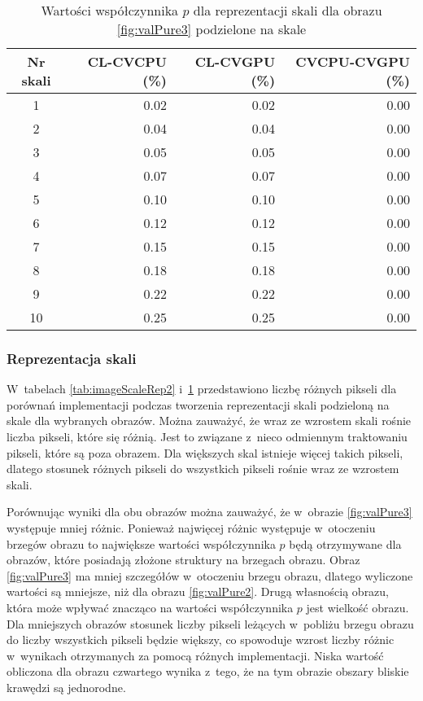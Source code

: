 \begin{center}
\begin{table}
\centering
\caption{Wartości współczynnika $ p $ dla reprezentacji skali dla obrazu \ref{fig:valPure3} podzielone na skale}
\label{tab:imageScaleRep3}
\begin{tabular}{|c|r|r|r|}
 \hline
Nr skali & CL-CVCPU (\%) & CL-CVGPU (\%) & CVCPU-CVGPU (\%) \\ \hline
1        & 0.02     & 0.02     & 0.00        \\ \hline
2        & 0.04     & 0.04     & 0.00        \\ \hline
3        & 0.05     & 0.05     & 0.00        \\ \hline
4        & 0.07     & 0.07     & 0.00        \\ \hline
5        & 0.10     & 0.10     & 0.00        \\ \hline
6        & 0.12     & 0.12     & 0.00        \\ \hline
7        & 0.15     & 0.15     & 0.00        \\ \hline
8        & 0.18     & 0.18     & 0.00        \\ \hline
9        & 0.22     & 0.22     & 0.00        \\ \hline
10       & 0.25     & 0.25     & 0.00        \\ \hline
\end{tabular}
\end{table}
\end{center}

\subsubsection{Reprezentacja skali}
\label{subsubsec:reprezentacjaSakliTabele}

W~tabelach \ref{tab:imageScaleRep2} i~\ref{tab:imageScaleRep3} przedstawiono liczbę różnych pikseli dla porównań implementacji podczas tworzenia reprezentacji skali podzieloną na skale dla wybranych obrazów. Można zauważyć, że wraz ze wzrostem skali rośnie liczba pikseli, które się różnią. Jest to związane z~nieco odmiennym traktowaniu pikseli, które są poza obrazem. Dla większych skal istnieje więcej takich pikseli, dlatego stosunek różnych pikseli do wszystkich pikseli rośnie wraz ze wzrostem skali.

Porównując wyniki dla obu obrazów można zauważyć, że w~obrazie \ref{fig:valPure3} występuje mniej różnic. Ponieważ najwięcej różnic występuje w~otoczeniu brzegów obrazu to największe wartości współczynnika $ p $ będą otrzymywane dla obrazów, które posiadają złożone struktury na brzegach obrazu. Obraz \ref{fig:valPure3} ma mniej szczegółów w~otoczeniu brzegu obrazu, dlatego wyliczone wartości są mniejsze, niż dla obrazu \ref{fig:valPure2}. Drugą własnością obrazu, która może wpływać znacząco na wartości współczynnika $ p $ jest wielkość obrazu. Dla mniejszych obrazów stosunek liczby pikseli leżących w~pobliżu brzegu obrazu do liczby wszystkich pikseli będzie większy, co spowoduje wzrost liczby różnic w~wynikach otrzymanych za pomocą różnych implementacji. Niska wartość obliczona dla obrazu czwartego wynika z~tego, że na tym obrazie obszary bliskie krawędzi są jednorodne.

